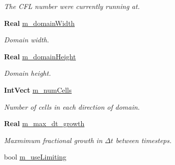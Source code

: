\begin{DoxyCompactItemize}
\begin{DoxyCompactList}\small\item\em The C\+FL number we\textquotesingle{}re currently running at. \end{DoxyCompactList}\item 
\mbox{\label{class_a_m_r_level_mushy_layer_a84fc3ef3cdbf715c83ff6d78293e9fee}} 
\textbf{ Real} \hyperlink{class_a_m_r_level_mushy_layer_a84fc3ef3cdbf715c83ff6d78293e9fee}{m\+\_\+domain\+Width}
\begin{DoxyCompactList}\small\item\em Domain width. \end{DoxyCompactList}\item 
\mbox{\label{class_a_m_r_level_mushy_layer_aa662bb49cb6956efb2998484054c2281}} 
\textbf{ Real} \hyperlink{class_a_m_r_level_mushy_layer_aa662bb49cb6956efb2998484054c2281}{m\+\_\+domain\+Height}
\begin{DoxyCompactList}\small\item\em Domain height. \end{DoxyCompactList}\item 
\mbox{\label{class_a_m_r_level_mushy_layer_a3b0c04c2f96d9a9ad8bf7dde59b91264}} 
\textbf{ Int\+Vect} \hyperlink{class_a_m_r_level_mushy_layer_a3b0c04c2f96d9a9ad8bf7dde59b91264}{m\+\_\+num\+Cells}
\begin{DoxyCompactList}\small\item\em Number of cells in each direction of domain. \end{DoxyCompactList}\item 
\mbox{\label{class_a_m_r_level_mushy_layer_a65a0a5abcc272ba9634034ff0fae81d8}} 
\textbf{ Real} \hyperlink{class_a_m_r_level_mushy_layer_a65a0a5abcc272ba9634034ff0fae81d8}{m\+\_\+max\+\_\+dt\+\_\+growth}
\begin{DoxyCompactList}\small\item\em Maxmimum fractional growth in $ \Delta t $ between timesteps. \end{DoxyCompactList}\item 
\mbox{\label{class_a_m_r_level_mushy_layer_a5afc0cf82e7f6ccff19bcd39751308f6}} 
bool \hyperlink{class_a_m_r_level_mushy_layer_a5afc0cf82e7f6ccff19bcd39751308f6}{m\+\_\+use\+Limiting}

\end{DoxyCompactItemize}
